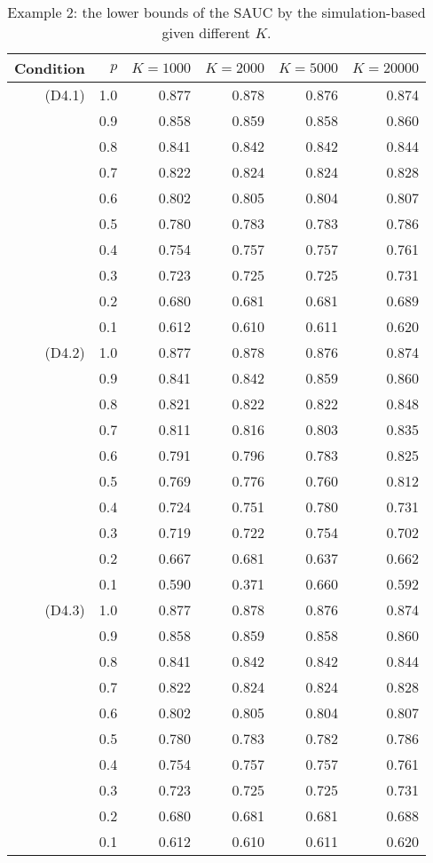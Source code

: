 \begin{table}

\caption{\label{tab:tab1}Example 2: the lower bounds of the SAUC by the simulation-based given different $K$.}
\centering
\begin{tabular}[t]{rrrrrr}
\toprule
Condition & $p$ & $K=1000$ & $K=2000$ & $K=5000$ & $K=20000$\\
\midrule
(D4.1) & 1.0 & 0.877 & 0.878 & 0.876 & 0.874\\
 & 0.9 & 0.858 & 0.859 & 0.858 & 0.860\\
 & 0.8 & 0.841 & 0.842 & 0.842 & 0.844\\
 & 0.7 & 0.822 & 0.824 & 0.824 & 0.828\\
 & 0.6 & 0.802 & 0.805 & 0.804 & 0.807\\
 & 0.5 & 0.780 & 0.783 & 0.783 & 0.786\\
 & 0.4 & 0.754 & 0.757 & 0.757 & 0.761\\
 & 0.3 & 0.723 & 0.725 & 0.725 & 0.731\\
 & 0.2 & 0.680 & 0.681 & 0.681 & 0.689\\
 & 0.1 & 0.612 & 0.610 & 0.611 & 0.620\\
(D4.2) & 1.0 & 0.877 & 0.878 & 0.876 & 0.874\\
 & 0.9 & 0.841 & 0.842 & 0.859 & 0.860\\
 & 0.8 & 0.821 & 0.822 & 0.822 & 0.848\\
 & 0.7 & 0.811 & 0.816 & 0.803 & 0.835\\
 & 0.6 & 0.791 & 0.796 & 0.783 & 0.825\\
 & 0.5 & 0.769 & 0.776 & 0.760 & 0.812\\
 & 0.4 & 0.724 & 0.751 & 0.780 & 0.731\\
 & 0.3 & 0.719 & 0.722 & 0.754 & 0.702\\
 & 0.2 & 0.667 & 0.681 & 0.637 & 0.662\\
 & 0.1 & 0.590 & 0.371 & 0.660 & 0.592\\
(D4.3) & 1.0 & 0.877 & 0.878 & 0.876 & 0.874\\
 & 0.9 & 0.858 & 0.859 & 0.858 & 0.860\\
 & 0.8 & 0.841 & 0.842 & 0.842 & 0.844\\
 & 0.7 & 0.822 & 0.824 & 0.824 & 0.828\\
 & 0.6 & 0.802 & 0.805 & 0.804 & 0.807\\
 & 0.5 & 0.780 & 0.783 & 0.782 & 0.786\\
 & 0.4 & 0.754 & 0.757 & 0.757 & 0.761\\
 & 0.3 & 0.723 & 0.725 & 0.725 & 0.731\\
 & 0.2 & 0.680 & 0.681 & 0.681 & 0.688\\
 & 0.1 & 0.612 & 0.610 & 0.611 & 0.620\\
\bottomrule
\end{tabular}
\end{table}
